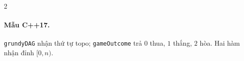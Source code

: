 \begin{multicols}{2}
\paragraph{Mẫu C++17.}
\texttt{grundyDAG} nhận thứ tự topo; \texttt{gameOutcome} trả
$0$ thua, $1$ thắng, $2$ hòa. Hai hàm nhận đỉnh $[0,n)$.
\end{multicols}
\endgroup
